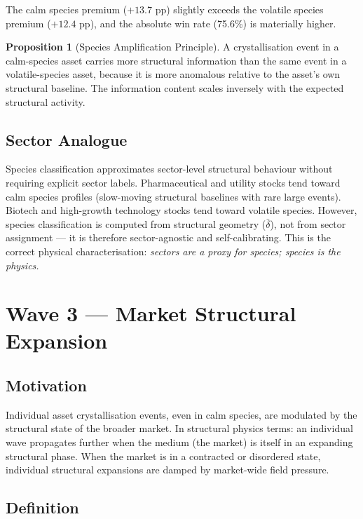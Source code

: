 \documentclass[11pt, a4paper]{article}
\theoremstyle{definition}
\newtheorem{proposition}{Proposition}
\begin{document}
The calm species premium ($+13.7$ pp) slightly exceeds the volatile species
premium ($+12.4$ pp), and the absolute win rate (75.6\%) is materially higher.

\begin{proposition}[Species Amplification Principle]
A crystallisation event in a calm-species asset carries more structural
information than the same event in a volatile-species asset, because it
is more anomalous relative to the asset's own structural baseline.
The information content scales inversely with the expected structural activity.
\end{proposition}

\subsection{Sector Analogue}

Species classification approximates sector-level structural behaviour without
requiring explicit sector labels.
Pharmaceutical and utility stocks tend toward calm species profiles (slow-moving
structural baselines with rare large events).
Biotech and high-growth technology stocks tend toward volatile species.
However, species classification is computed from structural geometry
($\bar{\delta}$), not from sector assignment — it is therefore sector-agnostic
and self-calibrating.
This is the correct physical characterisation: \emph{sectors are a proxy for
species; species is the physics.}

\section{Wave 3 — Market Structural Expansion}

\subsection{Motivation}

Individual asset crystallisation events, even in calm species, are modulated
by the structural state of the broader market.
In structural physics terms: an individual wave propagates further when the
medium (the market) is itself in an expanding structural phase.
When the market is in a contracted or disordered state, individual
structural expansions are damped by market-wide field pressure.

\subsection{Definition}
\end{document}
